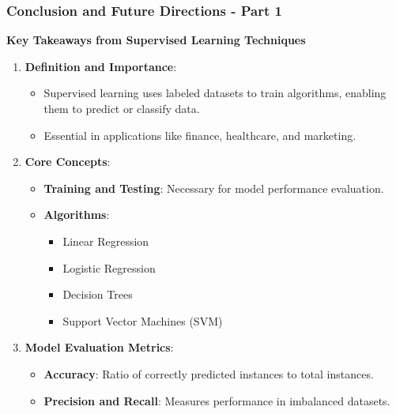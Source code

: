 \documentclass[aspectratio=169]{beamer}
\begin{document}
\begin{frame}[fragile]
    \frametitle{Conclusion and Future Directions - Part 1}
    
    \textbf{Key Takeaways from Supervised Learning Techniques}
    
    \begin{enumerate}
        \item \textbf{Definition and Importance}:
        \begin{itemize}
            \item Supervised learning uses labeled datasets to train algorithms, enabling them to predict or classify data.
            \item Essential in applications like finance, healthcare, and marketing.
        \end{itemize}

        \item \textbf{Core Concepts}:
        \begin{itemize}
            \item \textbf{Training and Testing}: Necessary for model performance evaluation.
            \item \textbf{Algorithms}:
            \begin{itemize}
                \item Linear Regression
                \item Logistic Regression
                \item Decision Trees
                \item Support Vector Machines (SVM)
            \end{itemize}
        \end{itemize}
        
        \item \textbf{Model Evaluation Metrics}:
        \begin{itemize}
            \item \textbf{Accuracy}: Ratio of correctly predicted instances to total instances.
            \item \textbf{Precision and Recall}: Measures performance in imbalanced datasets.
        \end{itemize}
    \end{enumerate}
\end{frame}
\end{document}
